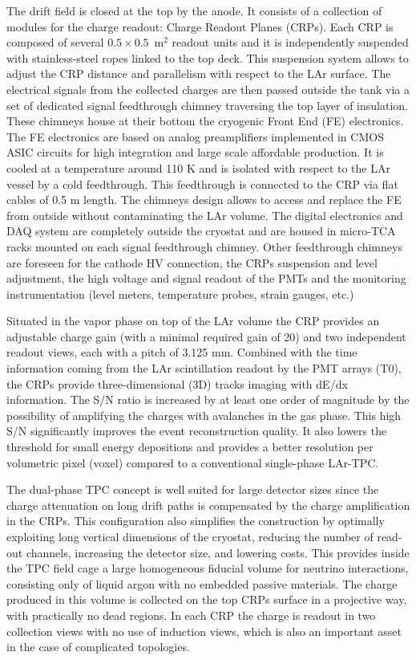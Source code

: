 The drift field is closed at the top by the anode. It consists of a
collection of modules for the charge readout: Charge Readout Planes
(CRPs). Each CRP is composed of several $0.5\times 0.5$~m$^2$ readout
units and it is independently suspended with stainless-steel ropes
linked to the top deck. This suspension system allows to adjust the
CRP distance and parallelism with respect to the LAr surface. The
electrical signals from the collected charges are then passed outside
the tank via a set of dedicated signal feedthrough chimney traversing
the top layer of insulation. These chimneys house at their bottom the
cryogenic Front End (FE) electronics.  The FE electronics are based on
analog preamplifiers implemented in CMOS ASIC circuits for high
integration and large scale affordable production. It is cooled at a
temperature around 110 K and is isolated with respect to the LAr
vessel by a cold feedthrough. This feedthrough is connected to the CRP
via flat cables of 0.5 m length. The chimneys design allows to access
and replace the FE from outside without contaminating the LAr
volume. The digital electronics and DAQ system are completely outside
the cryostat and are housed in micro-TCA racks mounted on each signal
feedthrough chimney. Other feedthrough chimneys are foreseen for the
cathode HV connection, the CRPs suspension and level adjustment, the
high voltage and signal readout of the PMTs and the monitoring
instrumentation (level meters, temperature probes, strain gauges,
etc.)

Situated in the vapor phase on top of the LAr volume the CRP provides
an adjustable charge gain (with a minimal required gain of 20) and two
independent readout views, each with a pitch of 3.125 mm.  Combined
with the time information coming from the LAr scintillation readout by
the PMT arrays (T0), the CRPs provide three-dimensional (3D) tracks
imaging with dE/dx information. The S/N ratio is increased by at least
one order of magnitude by the possibility of amplifying the charges
with avalanches in the gas phase.  This high S/N significantly
improves the event reconstruction quality. It also lowers the
threshold for small energy depositions and provides a better
resolution per volumetric pixel (voxel) compared to a conventional
single-phase LAr-TPC.

The dual-phase TPC concept is well suited for large detector sizes
since the charge attenuation on long drift paths is compensated by the
charge amplification in the CRPs.  This configuration also simplifies
the construction by optimally exploiting long vertical dimensions of
the cryostat, reducing the number of read-out channels, increasing the
detector size, and lowering costs.  This provides inside the TPC field
cage a large homogeneous fiducial volume for neutrino interactions,
consisting only of liquid argon with no embedded passive
materials. The charge produced in this volume is collected on the top
CRPs surface in a projective way, with practically no dead regions. In
each CRP the charge is readout in two collection views with no use of
induction views, which is also an important asset in the case of
complicated topologies.

